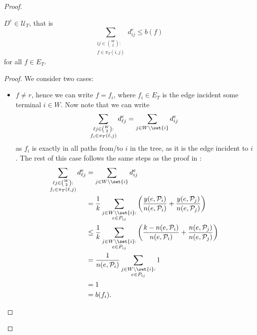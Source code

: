 \begin{proof}
    \renewcommand\theclaim{1}
    \begin{claim}
        $D^e \in \mathcal U_T$, that is
        \[
            \sum_{\substack{ij \in \binom{W}{2}:\\f \in \pi_T(i,j)}} d^e_{ij} \le b(f)
        \]
        for all $f \in E_T$.
    \end{claim}
    \begin{proof}
        We consider two cases:
        \begin{itemize}
            \item $f \neq r$, hence we can write $f = f_i$, where $f_i \in E_T$ is the edge incident some terminal $i \in W$.
            Now note that we can write
            \[
                \sum_{\substack{\ell j \in \binom{W}{2}:\\f_i \in \pi_T(\ell,j)}} d^e_{\ell j} = \sum_{j \in W \setminus \set{i}} d^e_{ij}
            \]
            as $f_i$ is exactly in all paths from/to $i$ in the tree, as it is the edge incident to $i$.
            The rest of this case follows the same steps as the proof in \cite{grandoni2008short}:
            \[
                \begin{split}
                    \sum_{\substack{\ell j \in \binom{W}{2}:\\f_i \in \pi_T(\ell,j)}} d^e_{\ell j} &= \sum_{j \in W \setminus \set{i}} d^e_{ij} \\
                    &= \frac 1 k \sum_{\substack{j \in W \setminus \set{i}:\\ e \in P_{ij}}} \left( \frac{y(e, \mathcal P_i)}{n(e, \mathcal P_i)} + \frac{y(e, \mathcal P_j)}{n(e, \mathcal P_j)} \right) \\
                    &\le \frac 1 k \sum_{\substack{j \in W \setminus \set{i}:\\ e \in P_{ij}}} \left( \frac{k - n(e, \mathcal P_i)}{n(e, \mathcal P_i)} + \frac{n(e, \mathcal P_j)}{n(e, \mathcal P_j)} \right) \\
                    &= \frac{1}{n(e, \mathcal P_i)} \sum_{\substack{j \in W \setminus \set{i}:\\ e \in P_{ij}}} 1 \\
                    &= 1 \\
                    &= b(f_i).
                \end{split}
            \]


\end{itemize}
\end{proof}
\end{proof}
